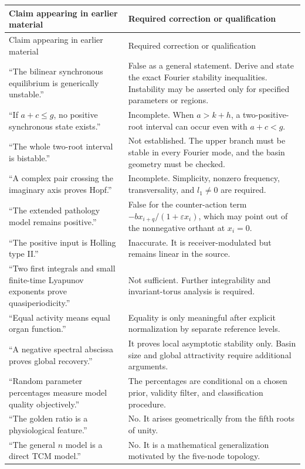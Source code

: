 \documentclass[11pt, reqno]{amsart}
\theoremstyle{definition}
\theoremstyle{remark}
\newcommand{\eps}{\varepsilon}
\begin{document}
\begin{longtable}{p{5.1cm}p{8.7cm}}
\toprule
Claim appearing in earlier material & Required correction or qualification \\
\midrule
\endfirsthead
\toprule
Claim appearing in earlier material & Required correction or qualification \\
\midrule
\endhead
``The bilinear synchronous equilibrium is generically unstable.'' & False as a general statement.  Derive and state the exact Fourier stability inequalities.  Instability may be asserted only for specified parameters or regions. \\
``If $a+c\le g$, no positive synchronous state exists.'' & Incomplete.  When $a>k+h$, a two-positive-root interval can occur even with $a+c<g$. \\
``The whole two-root interval is bistable.'' & Not established.  The upper branch must be stable in every Fourier mode, and the basin geometry must be checked. \\
``A complex pair crossing the imaginary axis proves Hopf.'' & Incomplete.  Simplicity, nonzero frequency, transversality, and $l_1\ne0$ are required. \\
``The extended pathology model remains positive.'' & False for the counter-action term $-b x_{i+q}/(1+\eps x_i)$, which may point out of the nonnegative orthant at $x_i=0$. \\
``The positive input is Holling type II.'' & Inaccurate.  It is receiver-modulated but remains linear in the source. \\
``Two first integrals and small finite-time Lyapunov exponents prove quasiperiodicity.'' & Not sufficient.  Further integrability and invariant-torus analysis is required. \\
``Equal activity means equal organ function.'' & Equality is only meaningful after explicit normalization by separate reference levels. \\
``A negative spectral abscissa proves global recovery.'' & It proves local asymptotic stability only.  Basin size and global attractivity require additional arguments. \\
``Random parameter percentages measure model quality objectively.'' & The percentages are conditional on a chosen prior, validity filter, and classification procedure. \\
``The golden ratio is a physiological feature.'' & No.  It arises geometrically from the fifth roots of unity. \\
``The general $n$ model is a direct TCM model.'' & No.  It is a mathematical generalization motivated by the five-node topology. \\
\bottomrule
\end{longtable}
\end{document}

